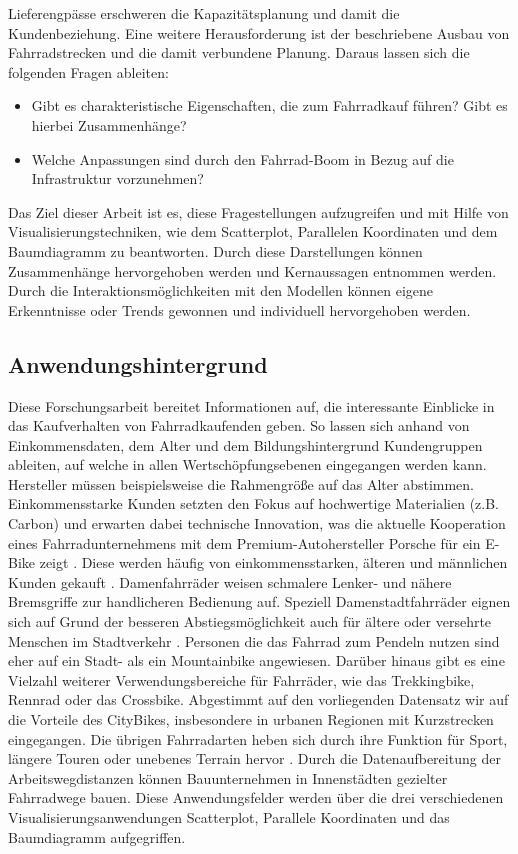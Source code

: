 \documentclass[usegeometry=true]{scrartcl}
\begin{document}
Lieferengpässe erschweren die Kapazitätsplanung und damit die Kundenbeziehung. Eine weitere Herausforderung ist der beschriebene Ausbau von Fahrradstrecken und die damit verbundene Planung. Daraus lassen sich die folgenden Fragen ableiten:
\begin{itemize}
\item Gibt es charakteristische Eigenschaften, die zum Fahrradkauf führen? Gibt es hierbei Zusammenhänge?
\item Welche Anpassungen sind durch den Fahrrad-Boom in Bezug auf die Infrastruktur vorzunehmen?
\end{itemize}
Das Ziel dieser Arbeit ist es, diese Fragestellungen  aufzugreifen und mit Hilfe von Visualisierungstechniken, wie dem Scatterplot, Parallelen Koordinaten und dem Baumdiagramm zu beantworten. Durch diese Darstellungen können Zusammenhänge hervorgehoben werden und Kernaussagen entnommen werden. Durch die Interaktionsmöglichkeiten mit den Modellen können eigene Erkenntnisse oder Trends gewonnen und individuell hervorgehoben werden.    

\subsection{Anwendungshintergrund}


Diese Forschungsarbeit bereitet Informationen auf, die interessante Einblicke in das Kaufverhalten von Fahrradkaufenden geben. So lassen sich anhand von Einkommensdaten, dem Alter und dem Bildungshintergrund Kundengruppen ableiten, auf welche in allen Wertschöpfungsebenen eingegangen werden kann. Hersteller müssen beispielsweise die Rahmengröße auf das Alter abstimmen. Einkommensstarke Kunden setzten den Fokus auf hochwertige Materialien (z.B. Carbon) und erwarten dabei technische Innovation, was die aktuelle Kooperation eines Fahrradunternehmens mit dem Premium-Autohersteller Porsche für ein E-Bike zeigt \cite{Nachrichten.31.08.2021}. Diese werden häufig von einkommensstarken, älteren und männlichen Kunden gekauft \cite{.07.09.2021,FahrradXXLBlog.14.12.2020}. Damenfahrräder weisen schmalere Lenker- und nähere Bremsgriffe zur handlicheren Bedienung auf. Speziell Damenstadtfahrräder eignen sich auf Grund der besseren Abstiegsmöglichkeit auch für ältere oder versehrte Menschen im Stadtverkehr \cite{Radfahren.08.02.2018}.
Personen die das Fahrrad zum Pendeln nutzen sind eher auf ein Stadt- als ein Mountainbike angewiesen.  Darüber hinaus gibt es eine Vielzahl weiterer  Verwendungsbereiche für Fahrräder, wie das Trekkingbike, Rennrad oder das Crossbike. Abgestimmt auf den vorliegenden Datensatz wir auf die Vorteile des CityBikes, insbesondere in urbanen Regionen mit Kurzstrecken eingegangen. Die übrigen Fahrradarten heben sich durch ihre Funktion für Sport, längere Touren oder unebenes Terrain hervor \cite{.04.09.2021}. 
Durch die Datenaufbereitung der Arbeitswegdistanzen können Bauunternehmen in Innenstädten gezielter Fahrradwege bauen. Diese Anwendungsfelder werden über die drei verschiedenen Visualisierungsanwendungen Scatterplot, Parallele Koordinaten und das Baumdiagramm aufgegriffen. 
 
\end{document}
